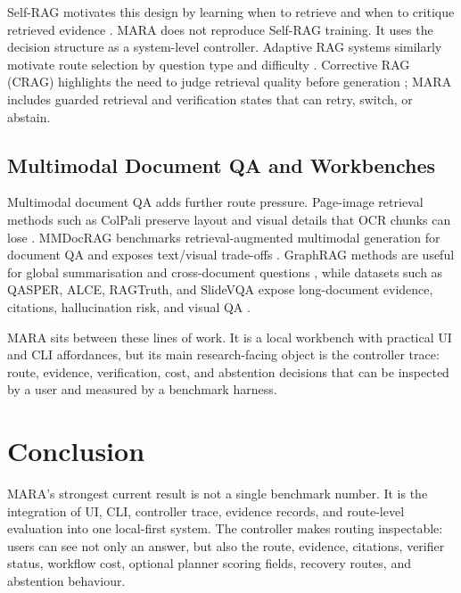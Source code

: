 Self-RAG motivates this design by learning when to retrieve and when to critique retrieved evidence \citep{asai2023selfrag}. MARA does not reproduce Self-RAG training. It uses the decision structure as a system-level controller. Adaptive RAG systems similarly motivate route selection by question type and difficulty \citep{jeong2024adaptiverag}. Corrective RAG (CRAG) highlights the need to judge retrieval quality before generation \citep{yan2024crag}; MARA includes guarded retrieval and verification states that can retry, switch, or abstain.

\subsection{Multimodal Document QA and Workbenches}

Multimodal document QA adds further route pressure. Page-image retrieval methods such as ColPali preserve layout and visual details that OCR chunks can lose \citep{faysse2024colpali}. MMDocRAG benchmarks retrieval-augmented multimodal generation for document QA and exposes text/visual trade-offs \citep{dong2025mmdocrag}. GraphRAG methods are useful for global summarisation and cross-document questions \citep{edge2024graphrag}, while datasets such as QASPER, ALCE, RAGTruth, and SlideVQA expose long-document evidence, citations, hallucination risk, and visual QA \citep{dasigi2021qasper,gao2023alce,niu2024ragtruth,tanaka2023slidevqa}.

MARA sits between these lines of work. It is a local workbench with practical UI and CLI affordances, but its main research-facing object is the controller trace: route, evidence, verification, cost, and abstention decisions that can be inspected by a user and measured by a benchmark harness.

\section{Conclusion}

MARA's strongest current result is not a single benchmark number. It is the integration of UI, CLI, controller trace, evidence records, and route-level evaluation into one local-first system. The controller makes routing inspectable: users can see not only an answer, but also the route, evidence, citations, verifier status, workflow cost, optional planner scoring fields, recovery routes, and abstention behaviour.

